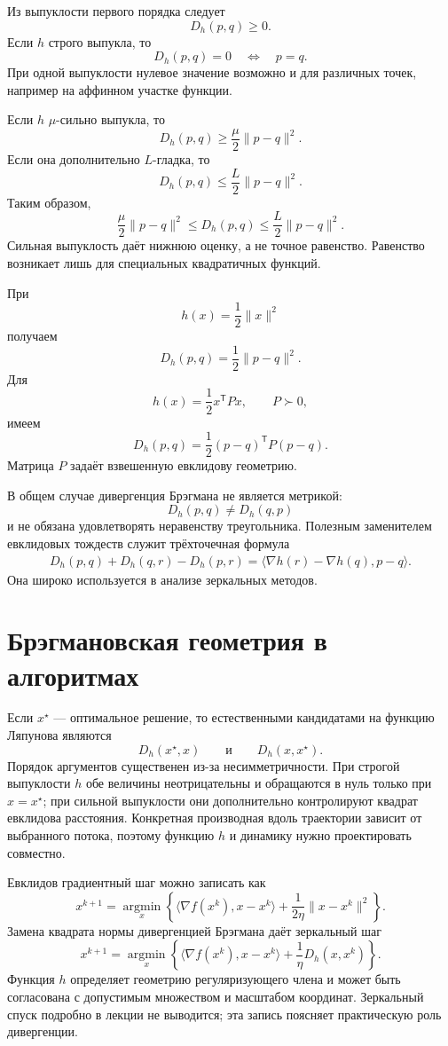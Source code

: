 Из выпуклости первого порядка следует
\[
    D_h(p,q)\ge0.
\]
Если \(h\) строго выпукла, то
\[
    D_h(p,q)=0
    \quad\Longleftrightarrow\quad
    p=q.
\]
При одной выпуклости нулевое значение возможно и для различных точек,
например на аффинном участке функции.

Если \(h\) \(\mu\)-сильно выпукла, то
\[
    D_h(p,q)
    \ge
    \frac\mu2\lVert p-q\rVert^2.
\]
Если она дополнительно \(L\)-гладка, то
\[
    D_h(p,q)
    \le
    \frac L2\lVert p-q\rVert^2.
\]
Таким образом,
\[
    \frac\mu2\lVert p-q\rVert^2
    \le
    D_h(p,q)
    \le
    \frac L2\lVert p-q\rVert^2.
\]
Сильная выпуклость даёт нижнюю оценку, а не точное равенство.
Равенство возникает лишь для специальных квадратичных функций.

При
\[
    h(x)=\frac12\lVert x\rVert^2
\]
получаем
\[
    D_h(p,q)=\frac12\lVert p-q\rVert^2.
\]
Для
\[
    h(x)=\frac12x^{\mathsf T}Px,
    \qquad
    P\succ0,
\]
имеем
\[
    D_h(p,q)
    =
    \frac12(p-q)^{\mathsf T}P(p-q).
\]
Матрица \(P\) задаёт взвешенную евклидову геометрию.

В общем случае дивергенция Брэгмана не является метрикой:
\[
    D_h(p,q)\ne D_h(q,p)
\]
и не обязана удовлетворять неравенству треугольника. Полезным
заменителем евклидовых тождеств служит трёхточечная формула
\[
\begin{aligned}
    D_h(p,q)+D_h(q,r)-D_h(p,r)
    =
    \langle\nabla h(r)-\nabla h(q),p-q\rangle.
\end{aligned}
\]
Она широко используется в анализе зеркальных методов.

\section{Брэгмановская геометрия в алгоритмах}

Если \(x^\star\) — оптимальное решение, то естественными
кандидатами на функцию Ляпунова являются
\[
    D_h(x^\star,x)
    \qquad\text{и}\qquad
    D_h(x,x^\star).
\]
Порядок аргументов существенен из-за несимметричности. При строгой
выпуклости \(h\) обе величины неотрицательны и обращаются в нуль
только при \(x=x^\star\); при сильной выпуклости они дополнительно
контролируют квадрат евклидова расстояния. Конкретная производная
вдоль траектории зависит от выбранного потока, поэтому функцию \(h\)
и динамику нужно проектировать совместно.

Евклидов градиентный шаг можно записать как
\[
    x^{k+1}
    =
    \operatorname*{argmin}_{x}
    \left\{
        \langle\nabla f(x^k),x-x^k\rangle
        +
        \frac1{2\eta}\lVert x-x^k\rVert^2
    \right\}.
\]
Замена квадрата нормы дивергенцией Брэгмана даёт зеркальный шаг
\[
    x^{k+1}
    =
    \operatorname*{argmin}_{x}
    \left\{
        \langle\nabla f(x^k),x-x^k\rangle
        +
        \frac1\eta D_h(x,x^k)
    \right\}.
\]
Функция \(h\) определяет геометрию регуляризующего члена и может быть
согласована с допустимым множеством и масштабом координат. Зеркальный
спуск подробно в лекции не выводится; эта запись поясняет практическую
роль дивергенции.


